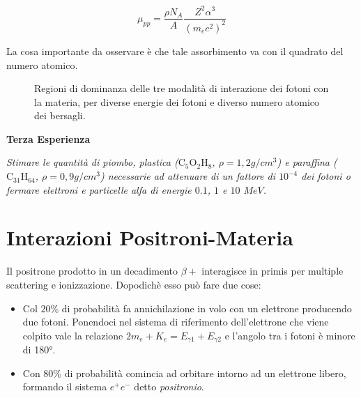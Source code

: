 \begin{equation}
\mu_{pp}=\frac{\rho N_A}{A}\frac{Z^2\alpha^3}{(m_ec^2)^2}
\end{equation}

La cosa importante da osservare è che tale assorbimento va con il quadrato del numero atomico.

\begin{figure}
\centering
		\caption{Regioni di dominanza delle tre modalità di interazione dei fotoni con la materia, per diverse energie dei fotoni e diverso numero atomico dei bersagli.}
         \label{crosssection}
\end{figure}



\textbf{Terza Esperienza}

\emph{Stimare le quantità di piombo, plastica ($\text{C}_5\text{O}_2\text{H}_8$, $\rho=1,2 g/cm^3$) e paraffina ($\text{C}_{31}\text{H}_{64}$, $\rho=0,9 g/cm^3$) necessarie ad attenuare di un fattore di $10^{-4}$ dei fotoni o fermare elettroni e particelle alfa di energie $0.1$, $1$ e $10$ $MeV$.}

\section{Interazioni Positroni-Materia}

Il positrone prodotto in un decadimento $\beta+$ interagisce in primis per multiple scattering e ionizzazione. Dopodichè esso può fare due cose:

\begin{itemize}
\item Col $20\%$ di probabilità fa annichilazione in volo con un elettrone producendo due fotoni. Ponendoci nel sistema di riferimento dell'elettrone che viene colpito vale la relazione $2m_e+K_e=E_{\gamma1}+E_{\gamma2}$ e l'angolo tra i fotoni è minore di \ang{180}.
\item Con 80\% di probabilità comincia ad orbitare intorno ad un elettrone libero, formando il sistema $e^+e^-$ detto \emph{positronio}.
\end{itemize}

